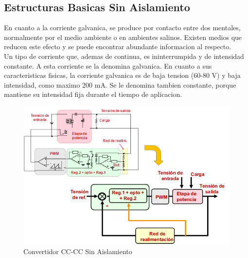 \documentclass[11pt]{article}
\begin{document}
\subsection{Estructuras Basicas Sin Aislamiento}
En cuanto a la corriente galvanica, se produce por contacto entre dos mentales, normalmente por el medio ambiente o en ambientes salinos. Existen medios que reducen este efecto y se puede encontrar abundante informacion al respecto.\\
Un tipo de corriente que, ademas de continua, es ininterrumpida y de intensidad constante. A esta corriente se la denomina galvanica. En cuanto a sus caracteristicas fisicas, la corriente galvanica es de baja tension (60-80 V) y baja intensidad, como maximo 200 mA. Se le denomina tambien constante, porque mantiene su intensidad fija durante el tiempo de aplicacion.
\begin{figure}[htp]
\centering
\includegraphics[scale=0.40]{Convertidor SIn Aislamiento.png}
\caption{Convertidor CC-CC Sin Aislamiento}
\label{}
\end{figure}
\end{document}
